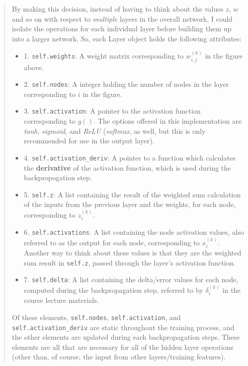 \documentclass{article}
\begin{document}
\begin{quote}
By making this decision, instead of having to think about the values $z$, $w$ and so on with respect to \textit{multiple} layers in the overall network, I could isolate the operations for each individual layer before building them up into a larger network. So, each Layer object holds the following attributes:
\begin{itemize}
	\item [] 1. \texttt{self.weights}: A weight matrix corresponding to $w_{i,j}^{(k)}$ in the figure above.
	\item [] 2. \texttt{self.nodes}: A integer holding the number of nodes in the layer corresponding to $i$ in the figure.
	\item [] 3. \texttt{self.activation}: A pointer to the activation function corresponding to $g()$. The options offered in this implementation are \textit{tanh}, \textit{sigmoid}, and \textit{ReLU} (\textit{softmax}, as well, but this is only recommended for use in the output layer).
	\item [] 4. \texttt{self.activation\_deriv}: A pointer to a function which calculates the \textbf{derivative} of the activation function, which is used during the backpropogation step.
	\item [] 5. \texttt{self.z}: A list containing the result of the weighted sum calculation of the inputs from the previous layer and the weights, for each node, corresponding to $z_i^{(k)}$.
	\item [] 6. \texttt{self.activations}: A list containing the node activation values, also referred to as the output for each node, corresponding to $x_i^{(k)}$. Another way to think about these values is that they are the weighted sum result in \texttt{self.z}, passed through the layer's activation function.
	\item [] 7.  \texttt{self.delta}: A list containing the delta/error values for each node, computed during the backpropagation step, referred to by $\delta_i^{(k)}$ in the course lecture materials.
\end{itemize}

Of these elements, \texttt{self.nodes}, \texttt{self.activation}, and \texttt{self.activation\_deriv} are static throughout the training process, and the other elements are updated during each backpropagation steps. These elements are all that are necessary for all of the hidden layer operations (other than, of course, the input from other layers/training features). 


\end{quote}
\end{document}
